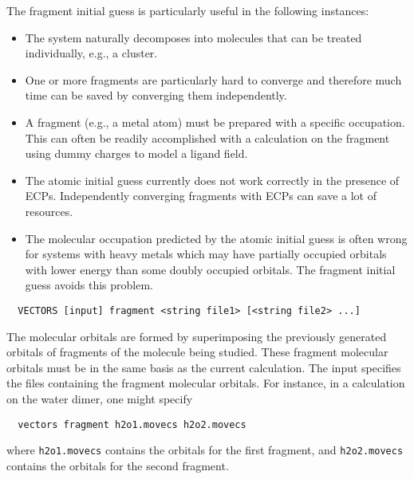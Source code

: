 The fragment initial guess is particularly useful in the following
instances:
\begin{itemize}
\item The system naturally decomposes into molecules that can be
  treated individually, e.g., a cluster.
\item One or more fragments are particularly hard to converge and
  therefore much time can be saved by converging them independently.
\item A fragment (e.g., a metal atom) must be prepared with a specific
  occupation.  This can often be readily accomplished with a
  calculation on the fragment using dummy charges to model a ligand
  field.
\item The atomic initial guess currently does not work correctly in
  the presence of ECPs.  Independently converging fragments with ECPs 
  can save a lot of resources.
\item The molecular occupation predicted by the atomic initial guess
  is often wrong for systems with heavy metals which may have
  partially occupied orbitals with lower energy than some doubly
  occupied orbitals.  The fragment initial guess avoids this problem.
\end{itemize}

\begin{verbatim}
  VECTORS [input] fragment <string file1> [<string file2> ...]
\end{verbatim}
The molecular orbitals are formed by superimposing the previously
generated orbitals of fragments of the molecule being studied.  These
fragment molecular orbitals must be in the same basis as the current
calculation.  The input specifies the files containing the fragment
molecular orbitals.  For instance, in a calculation on the water
dimer, one might specify
\begin{verbatim}
  vectors fragment h2o1.movecs h2o2.movecs
\end{verbatim}
where \verb+h2o1.movecs+ contains the orbitals for the first fragment, and
\verb+h2o2.movecs+ contains the orbitals for the second fragment.


